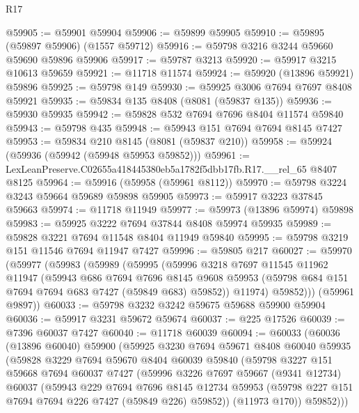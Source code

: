 \begin{lexlean}{R17}
\begin{coremodule}
@59905 := @59901 @59904
@59906 := @59899 @59905
@59910 := @59895 (@59897 @59906) (@1557 @59712)
@59916 := @59798 @3216 @3244 @59660 @59690 @59896 @59906
@59917 := @59787 @3213
@59920 := @59917 @3215 @10613 @59659
@59921 := @11718 @11574
@59924 := @59920 (@13896 @59921) @59896
@59925 := @59798 @149
@59930 := @59925 @3006 @7694 @7697 @8408 @59921
@59935 := @59834 @135 @8408 (@8081 (@59837 @135))
@59936 := @59930 @59935
@59942 := @59828 @532 @7694 @7696 @8404 @11574 @59840
@59943 := @59798 @435
@59948 := @59943 @151 @7694 @7694 @8145 @7427
@59953 := @59834 @210 @8145 (@8081 (@59837 @210))
@59958 := @59924 (@59936 (@59942 (@59948 @59953 @59852)))
@59961 := LexLeanPreserve.C02655a418445380eb5a1782f5dbb17fb.R17.__rel_65 @8407 @8125
@59964 := @59916 (@59958 (@59961 @8112))
@59970 := @59798 @3224 @3243 @59664 @59689 @59898 @59905
@59973 := @59917 @3223 @37845 @59663
@59974 := @11718 @11949
@59977 := @59973 (@13896 @59974) @59898
@59983 := @59925 @3222 @7694 @37844 @8408 @59974 @59935
@59989 := @59828 @3221 @7694 @11548 @8404 @11949 @59840
@59995 := @59798 @3219 @151 @11546 @7694 @11947 @7427
@59996 := @59805 @217
@60027 := @59970
    (@59977
      (@59983
        (@59989
          (@59995
            (@59996
              @3218
              @7697
              @11545
              @11962
              @11947
              (@59943
                @686
                @7694
                @7696
                @8145
                @9608
                @59953
                (@59798 @684 @151 @7694 @7694 @683 @7427 (@59849 @683) @59852))
              @11974)
            @59852)))
      (@59961 @9897))
@60033 := @59798 @3232 @3242 @59675 @59688 @59900 @59904
@60036 := @59917 @3231 @59672 @59674
@60037 := @225 @17526
@60039 := @7396 @60037 @7427
@60040 := @11718 @60039
@60094 := @60033
    (@60036
      (@13896 @60040)
      @59900
      (@59925
        @3230
        @7694
        @59671
        @8408
        @60040
        @59935
        (@59828
          @3229
          @7694
          @59670
          @8404
          @60039
          @59840
          (@59798
            @3227
            @151
            @59668
            @7694
            @60037
            @7427
            (@59996
              @3226
              @7697
              @59667
              (@9341 @12734)
              @60037
              (@59943
                @229
                @7694
                @7696
                @8145
                @12734
                @59953
                (@59798 @227 @151 @7694 @7694 @226 @7427 (@59849 @226) @59852))
              (@11973 @170))
            @59852)))

\end{coremodule}
\end{lexlean}
